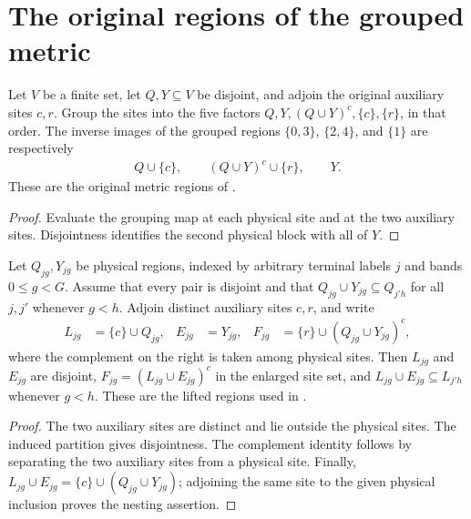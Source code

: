 \section{The original regions of the grouped metric}
\label{sec:regional_replica_metric_regions}

\begin{theorem}
\label{thm:regional_replica_metric_regions}
\leanok
Let $V$ be a finite set, let $Q,Y\subseteq V$ be disjoint, and adjoin the original auxiliary
sites $c,r$. Group the sites into the five factors
$Q,Y,(Q\cup Y)^c,\{c\},\{r\}$, in that order.
The inverse images of the grouped regions $\{0,3\}$, $\{2,4\}$,
and $\{1\}$ are respectively
\begin{align*}
 Q\cup\{c\},\qquad (Q\cup Y)^c\cup\{r\},\qquad Y.
\end{align*}
These are the original metric regions of
\cite[Section~8]{OpenAI2026AreaLaw}.
\end{theorem}
\begin{proof}
\leanok
{}
Evaluate the grouping map at each physical site and at the two
auxiliary sites. Disjointness identifies the second physical block
with all of $Y$.
\end{proof}

\begin{theorem}
\label{thm:replica_metric_lifted_region_geometry}
\leanok
Let $Q_{jg},Y_{jg}$ be physical regions, indexed by arbitrary terminal
labels $j$ and bands $0\leq g<G$. Assume that every pair is disjoint
and that $Q_{jg}\cup Y_{jg}\subseteq Q_{j'h}$ for all $j,j'$ whenever
$g<h$. Adjoin distinct auxiliary sites $c,r$, and write
\begin{align*}
 L_{jg}&=\{c\}\cup Q_{jg},
 &E_{jg}&=Y_{jg},
 &F_{jg}&=\{r\}\cup(Q_{jg}\cup Y_{jg})^c,
\end{align*}
where the complement on the right is taken among physical sites.
Then $L_{jg}$ and $E_{jg}$ are disjoint, $F_{jg}=(L_{jg}\cup E_{jg})^c$
in the enlarged site set, and $L_{jg}\cup E_{jg}\subseteq L_{j'h}$
whenever $g<h$. These are the lifted regions used in
\cite[Section~8, lines~80--110 and~421--443]{OpenAI2026AreaLaw}.
\end{theorem}
\begin{proof}
\leanok
{}
The two auxiliary sites are distinct and lie outside the physical sites.
The induced partition gives disjointness. The complement identity follows
by separating the two auxiliary sites from a physical site. Finally,
$L_{jg}\cup E_{jg}=\{c\}\cup(Q_{jg}\cup Y_{jg})$; adjoining the same
site to the given physical inclusion proves the nesting assertion.
\end{proof}

